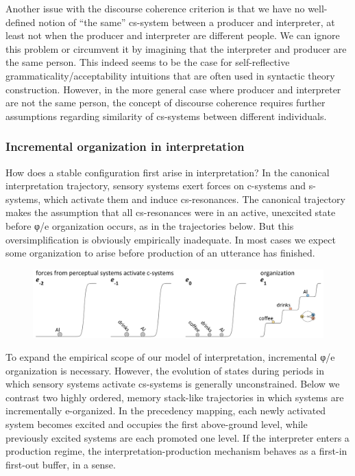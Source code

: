   Another issue with the discourse coherence criterion is that we have no well-defined notion of “the same” cs-system between a producer and interpreter, at least not when the producer and interpreter are different people. We can ignore this problem or circumvent it by imagining that the interpreter and producer are the same person. This indeed seems to be the case for self-reflective grammaticality/acceptability intuitions that are often used in syntactic theory construction. However, in the more general case where producer and interpreter are not the same person, the concept of discourse coherence requires further assumptions regarding similarity of cs-systems between different individuals.  

\subsubsection{Incremental organization in interpretation}

How does a stable configuration first arise in interpretation? In the canonical interpretation trajectory, sensory systems exert forces on c-systems and s-systems, which activate them and induce cs-resonances. The canonical trajectory makes the assumption that all cs-resonances were in an active, unexcited state before φ/e organization occurs, as in the trajectories below. But this oversimplification is obviously empirically inadequate. In most cases we expect some organization to arise before production of an utterance has finished.

  
\begin{figure}
\includegraphics[width=\textwidth]{figures/Tilsen-img127.png}
\caption{\missingcaption}
\label{fig:}
\end{figure}
 

  To expand the empirical scope of our model of interpretation, incremental φ/e organization is necessary. However, the evolution of states during periods in which sensory systems activate cs-systems is generally unconstrained. Below we contrast two highly ordered, memory stack-like trajectories in which systems are incrementally e-organized. In the precedency mapping, each newly activated system becomes excited and occupies the first above-ground level, while previously excited systems are each promoted one level. If the interpreter enters a production regime, the interpretation-production mechanism behaves as a first-in first-out buffer, in a sense. 

